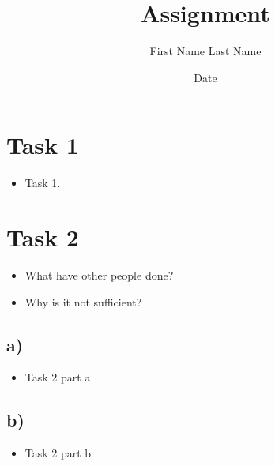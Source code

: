 \documentclass[ai_lab]{assignment}
\title{Assignment}
\author{First Name Last Name}
\date{Date}
\begin{document}
\maketitle

\pagestyle{plain}

\section{Task 1}
\begin{itemize}
    \item Task 1.
\end{itemize}




\section{Task 2}
\begin{itemize}
    \item What have other people done?
    \item Why is it not sufficient?
\end{itemize}

\subsection{a)}
\begin{itemize}
    \item Task 2 part a
\end{itemize}

\subsection{b)}
\begin{itemize}
    \item Task 2 part b
\end{itemize}


\nocite{*}

\end{document}
